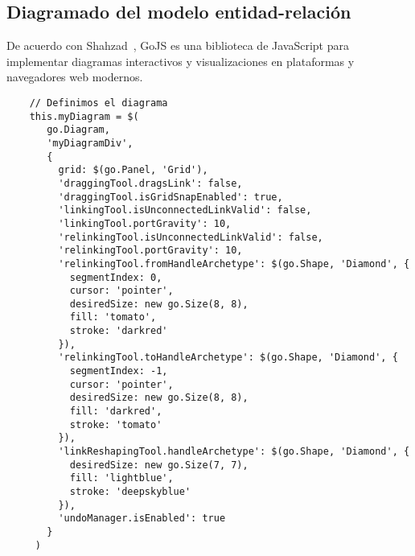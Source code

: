 \subsection{Diagramado del modelo entidad-relación}
De acuerdo con Shahzad~\cite{shahzad_review_2016}, GoJS es una biblioteca de JavaScript para implementar diagramas interactivos y visualizaciones en plataformas y navegadores web modernos. 



\begin{code}
\label{code:diagram-gojs}
\begin{verbatim}
    // Definimos el diagrama
    this.myDiagram = $(
       go.Diagram,
       'myDiagramDiv', 
       {
         grid: $(go.Panel, 'Grid'),
         'draggingTool.dragsLink': false,
         'draggingTool.isGridSnapEnabled': true,
         'linkingTool.isUnconnectedLinkValid': false,
         'linkingTool.portGravity': 10,
         'relinkingTool.isUnconnectedLinkValid': false,
         'relinkingTool.portGravity': 10,
         'relinkingTool.fromHandleArchetype': $(go.Shape, 'Diamond', {
           segmentIndex: 0,
           cursor: 'pointer',
           desiredSize: new go.Size(8, 8),
           fill: 'tomato',
           stroke: 'darkred'
         }),
         'relinkingTool.toHandleArchetype': $(go.Shape, 'Diamond', {
           segmentIndex: -1,
           cursor: 'pointer',
           desiredSize: new go.Size(8, 8),
           fill: 'darkred',
           stroke: 'tomato'
         }),
         'linkReshapingTool.handleArchetype': $(go.Shape, 'Diamond', {
           desiredSize: new go.Size(7, 7),
           fill: 'lightblue',
           stroke: 'deepskyblue'
         }),
         'undoManager.isEnabled': true
       }
     )


\end{verbatim}
\end{code}
